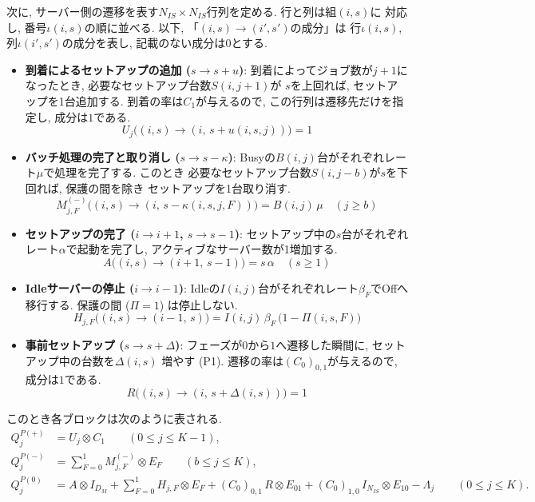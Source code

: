 \documentclass[a4paper, 11pt, dvipdfmx]{jsreport}
\begin{document}
次に, サーバー側の遷移を表す$N_{IS} \times N_{IS}$行列を定める. 行と列は組$(i, s)$に
対応し, 番号$\iota(i, s)$の順に並べる. 以下, 「$(i, s) \to (i', s')$の成分」は
行$\iota(i, s)$, 列$\iota(i', s')$の成分を表し, 記載のない成分は$0$とする. 
\begin{itemize}
    \item \textbf{到着によるセットアップの追加 ($s \to s + u$)}:
    到着によってジョブ数が$j+1$になったとき, 必要なセットアップ台数$S(i, j+1)$が
    $s$を上回れば, セットアップを1台追加する. 
    到着の率は$C_1$が与えるので, この行列は遷移先だけを指定し, 成分は$1$である. 
    \[ U_j\big((i, s) \to (i, \, s + u(i, s, j))\big) = 1 \]
 
    \item \textbf{バッチ処理の完了と取り消し ($s \to s - \kappa$)}:
    Busyの$B(i, j)$台がそれぞれレート$\mu$で処理を完了する. このとき
    必要なセットアップ台数$S(i, j-b)$が$s$を下回れば, 保護の間を除き
    セットアップを1台取り消す. 
    \[ M^{(-)}_{j, F}\big((i, s) \to (i, \, s - \kappa(i, s, j, F))\big) = B(i, j)\, \mu
        \quad (j \ge b) \]
 
    \item \textbf{セットアップの完了 ($i \to i+1$, $s \to s-1$)}:
    セットアップ中の$s$台がそれぞれレート$\alpha$で起動を完了し, 
    アクティブなサーバー数が1増加する. 
    \[ A\big((i, s) \to (i+1, \, s-1)\big) = s\, \alpha \quad (s \ge 1) \]
 
    \item \textbf{Idleサーバーの停止 ($i \to i-1$)}:
    Idleの$I(i, j)$台がそれぞれレート$\beta_F$でOffへ移行する. 
    保護の間 ($\Pi = 1$) は停止しない. 
    \[ H_{j, F}\big((i, s) \to (i-1, \, s)\big) = I(i, j)\, \beta_F\, \bigl(1 - \Pi(i, s, F)\bigr) \]
 
    \item \textbf{事前セットアップ ($s \to s + \Delta$)}:
    フェーズが$0$から$1$へ遷移した瞬間に, セットアップ中の台数を$\Delta(i, s)$
    増やす (P1). 遷移の率は$(C_0)_{0, 1}$が与えるので, 成分は$1$である. 
    \[ R\big((i, s) \to (i, \, s + \Delta(i, s))\big) = 1 \]
\end{itemize}
 
このとき各ブロックは次のように表される. 
\begin{align}
    Q^{P(+)}_j &= U_j \otimes C_1
        \qquad (0 \le j \le K-1), 
        \label{eq:pred-Qplus} \\
    Q^{P(-)}_j &= \sum_{F=0}^{1} M^{(-)}_{j, F} \otimes E_F
        \qquad (b \le j \le K), 
        \label{eq:pred-Qminus} \\
    Q^{P(0)}_j &= A \otimes I_{D_M}
        + \sum_{F=0}^{1} H_{j, F} \otimes E_F
        + (C_0)_{0, 1}\, R \otimes E_{01}
        + (C_0)_{1, 0}\, I_{N_{IS}} \otimes E_{10}
        - \Lambda_j
        \qquad (0 \le j \le K). 
        \label{eq:pred-Qzero}
\end{align}
\end{document}
